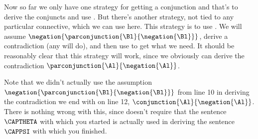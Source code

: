 Now so far we only have one strategy for getting a conjunction and that's to derive the conjuncts and use . 
But there's another strategy, not tied to any particular connective, which we can use here. 
This strategy is to use . 
We will assume $\negation{\parconjunction{\Bl}{\negation{\Bl}}}$, derive a contradiction (any will do), and then use  to get what we need. 
It should be reasonably clear that this strategy will work, since we obviously can derive the contradiction $\parconjunction{\Al}{\negation{\Al}}$.
\begin{gproof}[\label{bycontradiction}]
\end{gproof}
Note that we didn't actually use the assumption $\negation{\parconjunction{\Bl}{\negation{\Bl}}}$ from line 10 in deriving the contradiction we end with on line 12, $\conjunction{\Al}{\negation{\Al}}$. There is nothing wrong with this, since  doesn't require that the sentence $\CAPTHETA$ with which you started is actually used in deriving the sentence $\CAPPSI$ with which you finished. 

